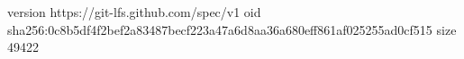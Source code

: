 version https://git-lfs.github.com/spec/v1
oid sha256:0c8b5df4f2bef2a83487becf223a47a6d8aa36a680eff861af025255ad0cf515
size 49422
